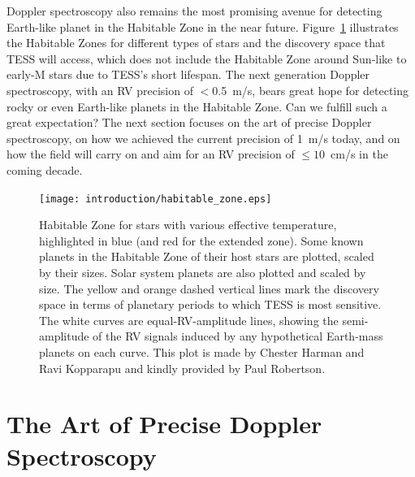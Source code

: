 Doppler spectroscopy also remains the most promising avenue for
detecting Earth-like planet in the Habitable Zone
\citep{1993Icar..101..108K, 2013ApJ...765..131K} in the near
future. Figure~\ref{intro:fig:hz} illustrates the Habitable Zones for
different types of stars and the discovery space that TESS will
access, which does not include the Habitable Zone around Sun-like to
early-M stars due to TESS's short lifespan. The next generation
Doppler spectroscopy, with an RV precision of $<$0.5~m/s, bears great
hope for detecting rocky or even Earth-like planets in the Habitable
Zone. Can we fulfill such a great expectation? The next section
focuses on the art of precise Doppler spectroscopy, on how we achieved
the current precision of 1~m/s today, and on how the field will carry
on and aim for an RV precision of $\le 10$~cm/s in the coming decade.


\begin{figure}
\centering
\texttt{[image: introduction/habitable\_zone.eps]}
\caption{Habitable Zone for stars with various effective temperature,
highlighted in blue (and red for the extended zone). Some known
planets in the Habitable Zone of their host stars are plotted, scaled
by their sizes. Solar system planets are also plotted and scaled by
size. The yellow and orange dashed vertical lines mark the discovery
space in terms of planetary periods to which TESS is most
sensitive. The white curves are equal-RV-amplitude lines, showing the
semi-amplitude of the RV signals induced by any hypothetical
Earth-mass planets on each curve. This plot is made by Chester Harman
and Ravi Kopparapu and kindly provided by Paul Robertson.
\label{intro:fig:hz}}
\end{figure}



\section{The Art of Precise Doppler Spectroscopy}

